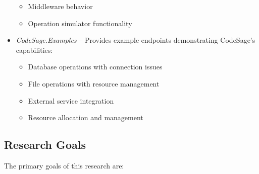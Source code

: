 \begin{itemize}
\begin{itemize}
        \item Middleware behavior
        \item Operation simulator functionality
    \end{itemize}
    \item \textit{CodeSage.Examples} – Provides example endpoints demonstrating CodeSage's capabilities:
    \begin{itemize}
        \item Database operations with connection issues
        \item File operations with resource management
        \item External service integration
        \item Resource allocation and management
    \end{itemize}
\end{itemize}

\subsection{Research Goals}
The primary goals of this research are:

